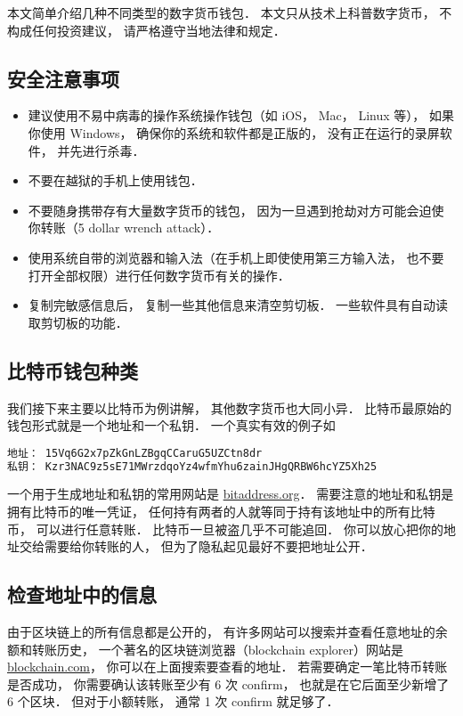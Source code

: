 
本文简单介绍几种不同类型的数字货币钱包． 本文只从技术上科普数字货币， 不构成任何投资建议， 请严格遵守当地法律和规定．

\subsection{安全注意事项}
\begin{itemize}
\item 建议使用不易中病毒的操作系统操作钱包（如 iOS， Mac， Linux 等）， 如果你使用 Windows， 确保你的系统和软件都是正版的， 没有正在运行的录屏软件， 并先进行杀毒．
\item 不要在越狱的手机上使用钱包．
\item 不要随身携带存有大量数字货币的钱包， 因为一旦遇到抢劫对方可能会迫使你转账（5 dollar wrench attack）．
\item 使用系统自带的浏览器和输入法（在手机上即使使用第三方输入法， 也不要打开全部权限）进行任何数字货币有关的操作．
\item 复制完敏感信息后， 复制一些其他信息来清空剪切板． 一些软件具有自动读取剪切板的功能．
\end{itemize}

\subsection{比特币钱包种类}
我们接下来主要以比特币为例讲解， 其他数字货币也大同小异． 比特币最原始的钱包形式就是一个地址和一个私钥． 一个真实有效的例子如
\begin{lstlisting}[language=bash]
地址： 15Vq6G2x7pZkGnLZBgqCCaruG5UZCtn8dr
私钥： Kzr3NAC9z5sE71MWrzdqoYz4wfmYhu6zainJHgQRBW6hcYZ5Xh25
\end{lstlisting}
一个用于生成地址和私钥的常用网站是 \href{https://www.bitaddress.org/}{bitaddress.org}． 需要注意的地址和私钥是拥有比特币的唯一凭证， 任何持有两者的人就等同于持有该地址中的所有比特币， 可以进行任意转账． 比特币一旦被盗几乎不可能追回． 你可以放心把你的地址交给需要给你转账的人， 但为了隐私起见最好不要把地址公开．

\subsection{检查地址中的信息}
由于区块链上的所有信息都是公开的， 有许多网站可以搜索并查看任意地址的余额和转账历史， 一个著名的区块链浏览器（blockchain explorer）网站是 \href{https://blockchain.com}{blockchain.com}， 你可以在上面搜索要查看的地址． 若需要确定一笔比特币转账是否成功， 你需要确认该转账至少有 6 次 confirm， 也就是在它后面至少新增了 6 个区块． 但对于小额转账， 通常 1 次 confirm 就足够了．

